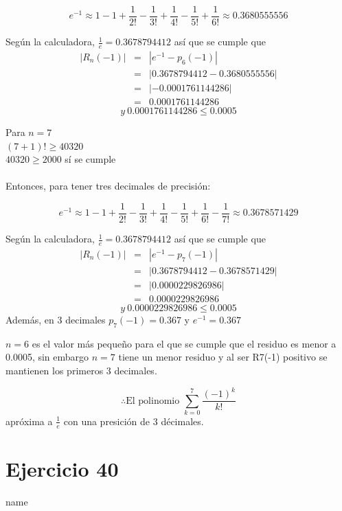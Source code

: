 \documentclass[12pt]{article}
\begin{document}
\[
e^{-1} \approx 1 -1 + \frac{1}{2!} - \frac{1}{3!} + \frac{1}{4!} - \frac{1}{5!}  + \frac{1}{6!} \approx 0.3680555556
\]

Según la calculadora, $\frac{1}{e} = 0.3678794412$
así que se cumple que 
\begin{eqnarray}
\left| R_n (-1)  \right| 
& = & \left| e^{-1}- p_6(-1)  \right|\nonumber
\\
& = & \left| 0.3678794412 - 0.3680555556\right|\nonumber
\\
& = & \left| -0.0001761144286 \right|  \nonumber
\\
& = & 0.0001761144286  \nonumber 
\end{eqnarray}
\[ y ~ 0.0001761144286  \leq 0.0005 \]

Para $n = 7$ \\
$(7+1)! \geq 40320$ \\
$ 40320 \geq  2000$ sí se cumple \\ \\
Entonces, para tener tres decimales de precisión:

\[
e^{-1} \approx 1 -1 + \frac{1}{2!} - \frac{1}{3!} + \frac{1}{4!} - \frac{1}{5!}  + \frac{1}{6!} -  \frac{1}{7!} \approx 0.3678571429
\]

Según la calculadora, $\frac{1}{e} = 0.3678794412$
así que se cumple que 
\begin{eqnarray}
\left| R_n (-1)  \right| 
& = & \left| e^{-1}- p_7(-1)  \right|\nonumber
\\
& = & \left| 0.3678794412 - 0.3678571429\right|\nonumber
\\
& = & \left| 0.0000229826986 \right|  \nonumber
\\
& = & 0.0000229826986 \nonumber 
\end{eqnarray}
\[ y ~ 0.0000229826986  \leq 0.0005 \]
Además, en 3 decimales $p_7(-1) = 0.367$  y $e^{-1} = 0.367 $

$n = 6$ es el valor más pequeño para el que se cumple que el residuo es menor a 0.0005, sin embargo $n=7$  tiene un menor residuo y al ser R7(-1) positivo se mantienen los primeros 3 decimales.

\[
\therefore \text{El polinomio } \sum_{k=0}^{7}\frac{(-1)^{k}}{k!} 
\]
apróxima a $\frac{1}{e}$  con una presición de 3 décimales.
\section{Ejercicio 40} name \\
\end{document}
